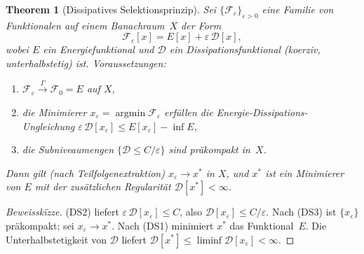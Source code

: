 \documentclass[12pt,a4paper]{article}
\newtheorem{theorem}{Theorem}[section]
\theoremstyle{definition}
\theoremstyle{remark}
\begin{document}
\begin{theorem}[Dissipatives Selektionsprinzip]\label{thm:dissipative-selection}
Sei $\{\mathcal{F}_\varepsilon\}_{\varepsilon > 0}$ eine Familie von Funktionalen auf einem Banachraum~$X$ der Form
\[
  \mathcal{F}_\varepsilon[x] = E[x] + \varepsilon\,\mathcal{D}[x],
\]
wobei $E$ ein Energiefunktional und $\mathcal{D}$ ein Dissipationsfunktional (koerziv, unterhalbstetig) ist. Voraussetzungen:
\begin{enumerate}
\item[\textup{(DS1)}] $\mathcal{F}_\varepsilon \xrightarrow{\Gamma} \mathcal{F}_0 = E$ auf $X$,
\item[\textup{(DS2)}] die Minimierer $x_\varepsilon = \operatorname{argmin} \mathcal{F}_\varepsilon$ erf\"ullen die Energie-Dissipations-Ungleichung $\varepsilon\,\mathcal{D}[x_\varepsilon] \leq E[x_\varepsilon] - \inf E$,
\item[\textup{(DS3)}] die Subniveaumengen $\{\mathcal{D} \leq C/\varepsilon\}$ sind pr\"akompakt in~$X$.
\end{enumerate}
Dann gilt (nach Teilfolgenextraktion) $x_\varepsilon \to x^*$ in $X$, und $x^*$ ist ein Minimierer von $E$ mit der zus\"atzlichen Regularit\"at $\mathcal{D}[x^*] < \infty$.
\end{theorem}

\begin{proof}[Beweissk\"{i}zze]
(DS2) liefert $\varepsilon\,\mathcal{D}[x_\varepsilon] \leq C$, also $\mathcal{D}[x_\varepsilon] \leq C/\varepsilon$. Nach (DS3) ist $\{x_\varepsilon\}$ pr\"akompakt; sei $x_\varepsilon \to x^*$. Nach (DS1) minimiert $x^*$ das Funktional~$E$. Die Unterhalbstetigkeit von $\mathcal{D}$ liefert $\mathcal{D}[x^*] \leq \liminf \mathcal{D}[x_\varepsilon] < \infty$.
\end{proof}
\end{document}
